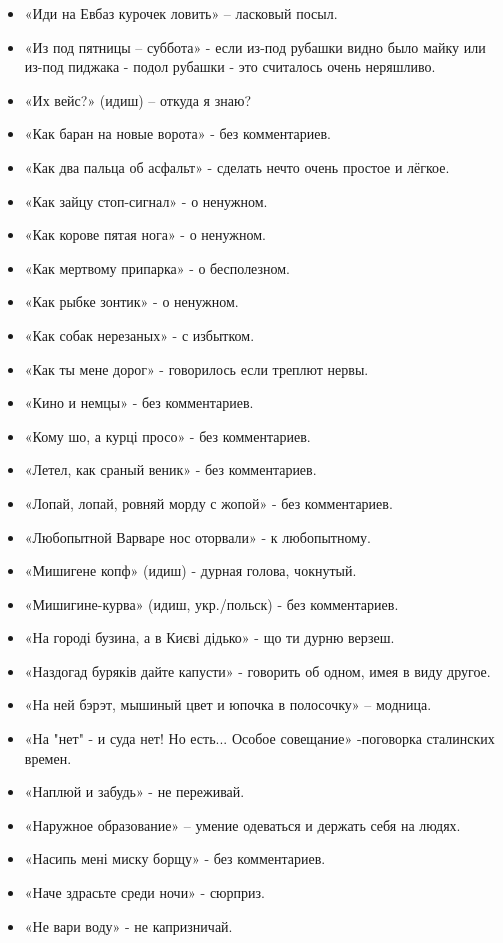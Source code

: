 \begin{itemize}
\item  «Иди на Евбаз курочек ловить» – ласковый посыл.
\item  «Из под пятницы – суббота» - если из-под рубашки видно было майку или из-под пиджака - подол рубашки - это считалось очень неряшливо.
\item  «Их вейс?» (идиш) – откуда я знаю?
\item  «Как баран на новые ворота» - без комментариев.
\item  «Как два пальца об асфальт» - сделать нечто очень простое и лёгкое.
\item  «Как зайцу стоп-сигнал» - о ненужном.
\item  «Как корове пятая нога» - о ненужном.
\item  «Как мертвому припарка» - о бесполезном.
\item  «Как рыбке зонтик» - о ненужном.
\item  «Как собак нерезаных» - с избытком.
\item  «Как ты мене дорог» - говорилось если треплют  нервы.
\item  «Кино и немцы» - без комментариев.
\item  «Кому шо, а курці просо» - без комментариев.
\item  «Летел, как сраный веник» - без комментариев.
\item  «Лопай, лопай, ровняй морду с жопой» - без комментариев.
\item  «Любопытной Варваре нос оторвали» - к любопытному.
\item  «Мишигене копф» (идиш) - дурная голова, чокнутый.
\item  «Мишигине-курва» (идиш, укр./польск) - без комментариев.
\item  «На городі бузина, а в Києві дідько» - що ти дурню верзеш.
\item  «Наздогад буряків дайте капусти» - говорить об одном, имея в виду другое.
\item  «На ней бэрэт, мышиный цвет и юпочка в полосочку» – модница.
\item  «На "нет" - и суда нет! Но есть... Особое совещание» -поговорка сталинских времен.
\item  «Наплюй и забудь» - не переживай.
\item  «Наружное образование» – умение одеваться и держать себя на людях.
\item  «Насипь мені миску борщу» - без комментариев.
\item  «Наче здрасьте среди ночи» - сюрприз.
\item  «Не вари воду» - не капризничай.

\end{itemize}
